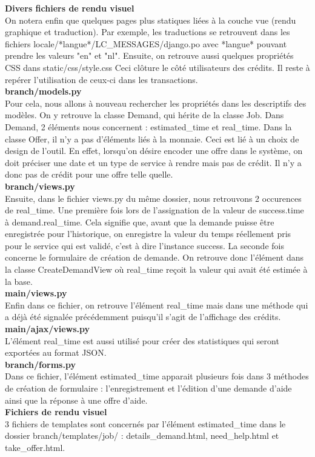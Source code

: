 \textbf{Divers fichiers de rendu visuel}
\\%
On notera enfin que quelques pages plus statiques liées à la couche vue (rendu graphique et traduction).  Par exemple,  les traductions se retrouvent dans les fichiers locale/*langue*/LC\_MESSAGES/django.po avec *langue* pouvant prendre les valeurs "en" et "nl".  Ensuite,  on retrouve aussi quelques propriétés CSS dans static/css/style.css 
\newline
Ceci clôture le côté utilisateurs des crédits.  Il reste à repérer l'utilisation de ceux-ci dans les transactions.  
\\
\textbf{branch/models.py}
\\%
Pour cela,  nous allons à nouveau rechercher les propriétés dans les descriptifs des modèles. 
On y retrouve la classe Demand,  qui hérite de la classe Job.  Dans Demand,  2 éléments nous concernent : estimated\_time et real\_time.  
Dans la classe Offer,  il n'y a pas d'éléments liés à la monnaie.  Ceci est lié à un choix de design de l'outil.  En effet,   lorsqu'on désire encoder une offre dans le système,  on doit préciser une date et un type de service à rendre mais pas de crédit.  Il n'y a donc pas de crédit pour une offre telle quelle.
\\
\textbf{branch/views.py}
\\%
Ensuite,  dans le fichier views.py du même dossier,   nous retrouvons 2 occurences de real\_time.  
Une première fois lors de l'assignation de la valeur de success.time à demand.real\_time.  Cela signifie que,  avant que la demande puisse être enregistrée pour l'historique,  on enregistre la valeur du temps réellement pris pour le service qui est validé,  c'est à dire l'instance success.
La seconde fois concerne le formulaire de création de demande.  On retrouve donc l'élément dans la classe CreateDemandView où real\_time reçoit la valeur qui avait été estimée à la base.  
\\
\textbf{main/views.py}
\\%
Enfin dans ce fichier,  on retrouve l'élément real\_time mais dans une méthode qui a déjà été signalée précédemment puisqu'il s'agit de l'affichage des crédits.
\\
\textbf{main/ajax/views.py}
\\%
L'élément real\_time est aussi utilisé pour créer des statistiques qui seront exportées au format JSON.
\\
\textbf{branch/forms.py}
\\%
Dans ce fichier,   l'élément estimated\_time apparait plusieurs fois dans 3 méthodes de création de formulaire : l'enregistrement et l'édition d'une demande d'aide ainsi que la réponse à une offre d'aide.
\\
\textbf{Fichiers de rendu visuel}
\\%
3 fichiers de templates sont concernés par l'élément estimated\_time dans le dossier branch/templates/job/ : details\_demand.html,  need\_help.html et take\_offer.html.

